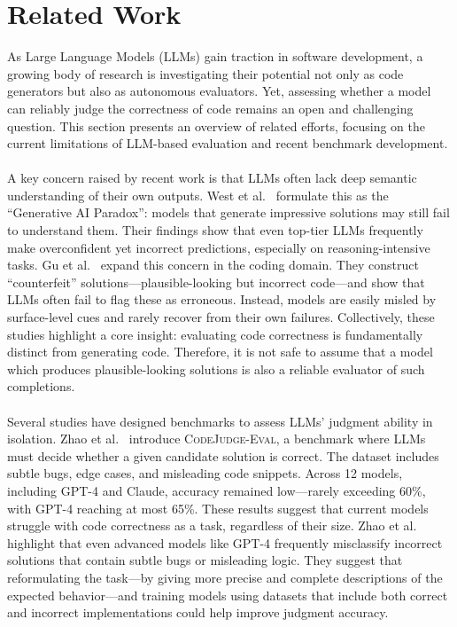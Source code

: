 \documentclass[a4paper]{usiinfbachelorproject}
\begin{document}
\section{Related Work}\label{sec:related}
As Large Language Models (LLMs) gain traction in software development, a growing body of research is investigating their potential not only as code generators but also as autonomous evaluators. Yet, assessing whether a model can reliably judge the correctness of code remains an open and challenging question. This section presents an overview of related efforts, focusing on the current limitations of LLM-based evaluation and recent benchmark development.\\
\\[2pt]
A key concern raised by recent work is that LLMs often lack deep semantic understanding of their own outputs. West et al.~\cite{west2023generative} formulate this as the “Generative AI Paradox”: models that generate impressive solutions may still fail to understand them. Their findings show that even top-tier LLMs frequently make overconfident yet incorrect predictions, especially on reasoning-intensive tasks. Gu et al.~\cite{gu2024counterfeit} expand this concern in the coding domain. They construct “counterfeit” solutions—plausible-looking but incorrect code—and show that LLMs often fail to flag these as erroneous. Instead, models are easily misled by surface-level cues and rarely recover from their own failures. Collectively, these studies highlight a core insight: evaluating code correctness is fundamentally distinct from generating code. Therefore, it is not safe to assume that a model which produces plausible-looking solutions is also a reliable evaluator of such completions.\\
\\[2pt]
Several studies have designed benchmarks to assess LLMs’ judgment ability in isolation. Zhao et al.~\cite{zhao2024codejudgeeval} introduce \textsc{CodeJudge-Eval}, a benchmark where LLMs must decide whether a given candidate solution is correct. The dataset includes subtle bugs, edge cases, and misleading code snippets. Across 12 models, including GPT-4 and Claude, accuracy remained low—rarely exceeding 60\%, with GPT-4 reaching at most 65\%. These results suggest that current models struggle with code correctness as a task, regardless of their size. Zhao et al. highlight that even advanced models like GPT-4 frequently misclassify incorrect solutions that contain subtle bugs or misleading logic. They suggest that reformulating the task—by giving more precise and complete descriptions of the expected behavior—and training models using datasets that include both correct and incorrect implementations could help improve judgment accuracy.\\
\end{document}

